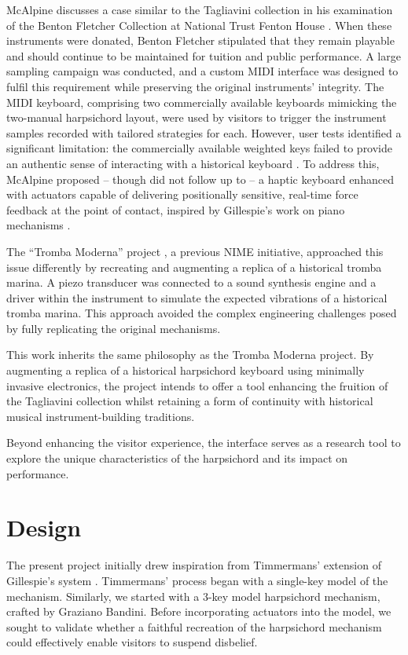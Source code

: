 McAlpine discusses a case similar to the Tagliavini collection in his examination of the Benton Fletcher Collection at National Trust Fenton House \cite{McAlpine2014}. When these instruments were donated, Benton Fletcher stipulated that they remain playable and should continue to be maintained for tuition and public performance. A large sampling campaign was conducted, and a custom MIDI interface was designed to fulfil this requirement while preserving the original instruments' integrity. The MIDI keyboard, comprising two commercially available keyboards mimicking the two-manual harpsichord layout, were used by visitors to trigger the instrument samples recorded with tailored strategies for each. However, user tests identified a significant limitation: the commercially available weighted keys failed to provide an authentic sense of interacting with a historical keyboard \cite{McAlpine2014}. To address this, McAlpine proposed -- though did not follow up to -- a haptic keyboard enhanced with actuators capable of delivering positionally sensitive, real-time force feedback at the point of contact, inspired by Gillespie’s work on piano mechanisms \cite{Gillespie1996}.

The ``Tromba Moderna'' project \cite{Baldwin2016}, a previous NIME initiative, approached this issue differently by recreating and augmenting a replica of a historical tromba marina. A piezo transducer was connected to a sound synthesis engine and a driver within the instrument to simulate the expected vibrations of a historical tromba marina. This approach avoided the complex engineering challenges posed by fully replicating the original mechanisms.

This work inherits the same philosophy as the Tromba Moderna project. By augmenting a replica of a historical harpsichord keyboard using minimally invasive electronics, the project intends to offer a tool enhancing the fruition of the Tagliavini collection whilst retaining a form of continuity with historical musical instrument-building traditions. 

Beyond enhancing the visitor experience, the interface serves as a research tool to explore the unique characteristics of the harpsichord and its impact on performance.

\section{Design}\label{design}

The present project initially drew inspiration from Timmermans' extension of Gillespie’s system \cite{Timmermans2020, Gillespie1996}. Timmermans’ process began with a single-key model of the mechanism. Similarly, we started with a 3-key model harpsichord mechanism, crafted by Graziano Bandini. Before incorporating actuators into the model, we sought to validate whether a faithful recreation of the harpsichord mechanism could effectively enable visitors to suspend disbelief.


